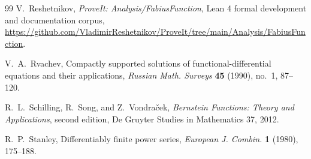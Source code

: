 \documentclass[11pt]{article}
\theoremstyle{definition}
\theoremstyle{remark}
\begin{document}
\begin{thebibliography}{99}
V.~Reshetnikov,
\newblock \emph{ProveIt: Analysis/FabiusFunction},
\newblock Lean 4 formal development and documentation corpus,
\newblock \url{https://github.com/VladimirReshetnikov/ProveIt/tree/main/Analysis/FabiusFunction}.

V.~A.~Rvachev,
\newblock Compactly supported solutions of functional-differential equations and their applications,
\newblock \emph{Russian Math. Surveys} \textbf{45} (1990), no.~1, 87--120.

R.~L.~Schilling, R.~Song, and Z.~Vondra\v{c}ek,
\newblock \emph{Bernstein Functions: Theory and Applications}, second edition,
\newblock De Gruyter Studies in Mathematics 37, 2012.

R.~P.~Stanley,
\newblock Differentiably finite power series,
\newblock \emph{European J. Combin.} \textbf{1} (1980), 175--188.

\end{thebibliography}
\endgroup
\end{document}
